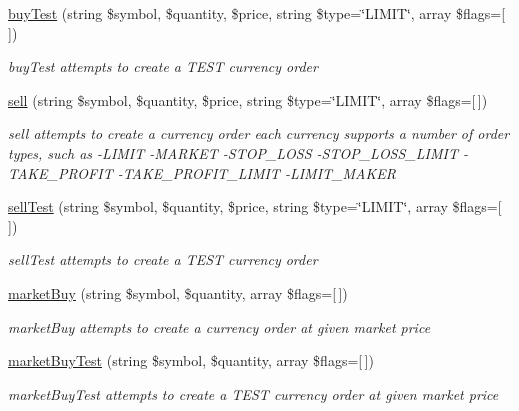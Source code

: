 \begin{DoxyCompactItemize}
\hyperlink{classBinance_1_1API_a9e199a90097fbee4e89e2777534599b7}{buy\-Test} (string \$symbol, \$quantity, \$price, string \$type=\char`\"{}L\-I\-M\-I\-T\char`\"{}, array \$flags=\mbox{[}$\,$\mbox{]})
\begin{DoxyCompactList}\small\item\em buy\-Test attempts to create a T\-E\-S\-T currency order \end{DoxyCompactList}\item 
\hyperlink{classBinance_1_1API_aa5d028c98ced18dab5194009f4abdb0e}{sell} (string \$symbol, \$quantity, \$price, string \$type=\char`\"{}L\-I\-M\-I\-T\char`\"{}, array \$flags=\mbox{[}$\,$\mbox{]})
\begin{DoxyCompactList}\small\item\em sell attempts to create a currency order each currency supports a number of order types, such as -\/\-L\-I\-M\-I\-T -\/\-M\-A\-R\-K\-E\-T -\/\-S\-T\-O\-P\-\_\-\-L\-O\-S\-S -\/\-S\-T\-O\-P\-\_\-\-L\-O\-S\-S\-\_\-\-L\-I\-M\-I\-T -\/\-T\-A\-K\-E\-\_\-\-P\-R\-O\-F\-I\-T -\/\-T\-A\-K\-E\-\_\-\-P\-R\-O\-F\-I\-T\-\_\-\-L\-I\-M\-I\-T -\/\-L\-I\-M\-I\-T\-\_\-\-M\-A\-K\-E\-R \end{DoxyCompactList}\item 
\hyperlink{classBinance_1_1API_a67841995467768588781cde190e59235}{sell\-Test} (string \$symbol, \$quantity, \$price, string \$type=\char`\"{}L\-I\-M\-I\-T\char`\"{}, array \$flags=\mbox{[}$\,$\mbox{]})
\begin{DoxyCompactList}\small\item\em sell\-Test attempts to create a T\-E\-S\-T currency order \end{DoxyCompactList}\item 
\hyperlink{classBinance_1_1API_aa6156e4c8d03bbdd8c16bbb18ea75646}{market\-Buy} (string \$symbol, \$quantity, array \$flags=\mbox{[}$\,$\mbox{]})
\begin{DoxyCompactList}\small\item\em market\-Buy attempts to create a currency order at given market price \end{DoxyCompactList}\item 
\hyperlink{classBinance_1_1API_ad11565e34ba1c715ac2478ee7f9aab6e}{market\-Buy\-Test} (string \$symbol, \$quantity, array \$flags=\mbox{[}$\,$\mbox{]})
\begin{DoxyCompactList}\small\item\em market\-Buy\-Test attempts to create a T\-E\-S\-T currency order at given market price \end{DoxyCompactList}\item 

\end{DoxyCompactItemize}
